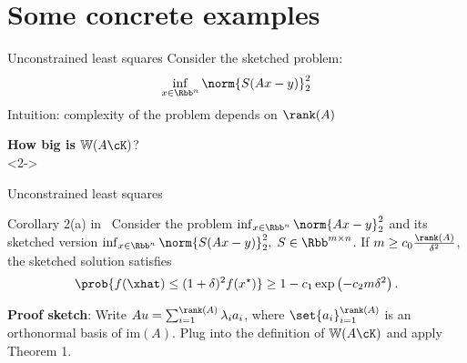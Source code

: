 \documentclass[10pt]{beamer}
\newcommand{\xstar}{x^{\star}}
\begin{document}
%        

\section{Some concrete examples}

\begin{frame}{Unconstrained least squares}
    Consider the sketched problem:
    \begin{align*}
        \inf_{x \in \Rbb^n} \norm{S(Ax - y)}_2^2
    \end{align*}
    Intuition: complexity of the problem depends on $\rank(A)$ \linebreak
    
    \begin{center}
        {\color{cred} \textbf{How big is} $\mathbb{W}(A \cK)$?} \\
        <2->
    \end{center}
\end{frame}

\begin{frame}{Unconstrained least squares}
    \begin{block}{Corollary 2(a) in~\cite{PilWain15}}
        Consider the problem $\inf_{x \in \Rbb^n} \norm{Ax - y}_2^2$ and its
        sketched version $\inf_{x \in \Rbb^n} \norm{S(Ax - y)}_2^2, \;
        S \in \Rbb^{m \times n}$. If $m \geq c_0 \frac{\rank(A)}{\delta^2}$, the
        sketched solution satisfies
        \[
            \prob{f(\xhat) \leq (1 + \delta)^2 f(\xstar)}
            \geq 1 - c_1 \exp\left(-c_2 m \delta^2\right).
        \]
    \end{block}
    \vspace{1em}
    
    \textbf{Proof sketch}:
        Write $Au = \sum_{i=1}^{\rank(A)} \lambda_i a_i$, where 
        $\set{a_i}_{i=1}^{\rank(A)}$ is an orthonormal basis of  
        $\mathrm{im}(A)$. Plug into the definition of $\mathbb{W}(A \cK)$
        and apply Theorem 1.
\end{frame}


\end{document}
